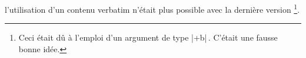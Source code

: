 

\begin{bdoctopic}
    l'utilisation d'un contenu verbatim n'était plus possible avec la dernière version 
    \footnote{
        Ceci était dû à l'emploi d'un argument de type \bdocinlatex|+b|\,. C'était une fausse bonne idée.
    }.
\end{bdoctopic}
